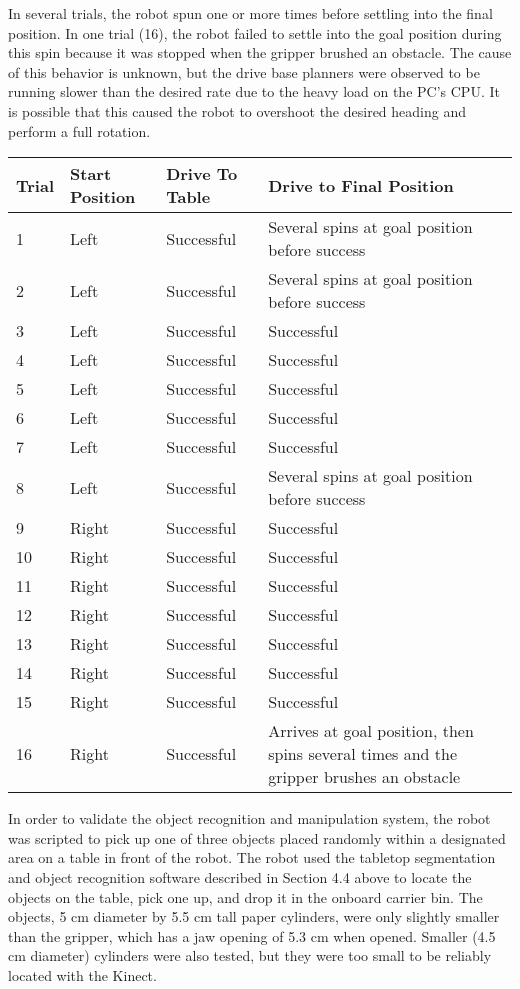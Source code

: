 \documentclass[]{cwru} %
\begin{document}
In several trials, the robot spun one or more times before settling into
the final position. In one trial (16), the robot failed to settle into
the goal position during this spin because it was stopped when the
gripper brushed an obstacle. The cause of this behavior is unknown, but
the drive base planners were observed to be running slower than the
desired rate due to the heavy load on the PC's CPU. It is possible that
this caused the robot to overshoot the desired heading and perform a
full rotation.

\begin{table}
\label{tab:drive-validation}
\caption{Results of drive base validation tests}

\begin{longtable}[c]{lllp{7.5cm}}
\toprule
\textbf{Trial} & \textbf{Start Position} & \textbf{Drive To Table} &
\textbf{Drive to Final Position}\tabularnewline
\midrule
1 & Left & Successful & Several spins at goal position before
success\tabularnewline
2 & Left & Successful & Several spins at goal position before
success\tabularnewline
3 & Left & Successful & Successful\tabularnewline
4 & Left & Successful & Successful\tabularnewline
5 & Left & Successful & Successful\tabularnewline
6 & Left & Successful & Successful\tabularnewline
7 & Left & Successful & Successful\tabularnewline
8 & Left & Successful & Several spins at goal position before
success\tabularnewline
9 & Right & Successful & Successful\tabularnewline
10 & Right & Successful & Successful\tabularnewline
11 & Right & Successful & Successful\tabularnewline
12 & Right & Successful & Successful\tabularnewline
13 & Right & Successful & Successful\tabularnewline
14 & Right & Successful & Successful\tabularnewline
15 & Right & Successful & Successful\tabularnewline
16 & Right & Successful & Arrives at goal position, then spins several
times and the gripper brushes an obstacle\tabularnewline
\bottomrule
\end{longtable}
\end{table}
In order to validate the object recognition and manipulation system, the
robot was scripted to pick up one of three objects placed randomly
within a designated area on a table in front of the robot. The robot
used the tabletop segmentation and object recognition software described
in Section 4.4 above to locate the objects on the table, pick one up,
and drop it in the onboard carrier bin. The objects, 5 cm diameter by
5.5 cm tall paper cylinders, were only slightly smaller than the
gripper, which has a jaw opening of 5.3 cm when opened. Smaller (4.5 cm
diameter) cylinders were also tested, but they were too small to be
reliably located with the Kinect.
\end{document}
